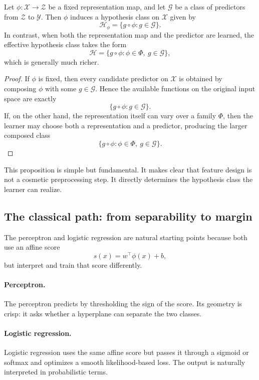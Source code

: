\begin{proposition}
Let $\phi:\mathcal X\to\mathcal Z$ be a fixed representation map, and let $\mathcal G$ be a class of predictors from $\mathcal Z$ to $\mathcal Y$. Then $\phi$ induces a hypothesis class on $\mathcal X$ given by
\[
\mathcal H_\phi=\{g\circ\phi : g\in\mathcal G\}.
\]
In contrast, when both the representation map and the predictor are learned, the effective hypothesis class takes the form
\[
\mathcal H=\{g\circ\phi : \phi\in\Phi,\ g\in\mathcal G\},
\]
which is generally much richer.
\end{proposition}

\begin{proof}
If $\phi$ is fixed, then every candidate predictor on $\mathcal X$ is obtained by composing $\phi$ with some $g\in\mathcal G$. Hence the available functions on the original input space are exactly
\[
\{g\circ\phi : g\in\mathcal G\}.
\]
If, on the other hand, the representation itself can vary over a family $\Phi$, then the learner may choose both a representation and a predictor, producing the larger composed class
\[
\{g\circ\phi : \phi\in\Phi,\ g\in\mathcal G\}.
\]
\end{proof}

This proposition is simple but fundamental. It makes clear that feature design is not a cosmetic preprocessing step. It directly determines the hypothesis class the learner can realize.

\subsection*{The classical path: from separability to margin}

The perceptron and logistic regression are natural starting points because both use an affine score
\[
s(x)=w^\top \phi(x)+b,
\]
but interpret and train that score differently.

\paragraph{Perceptron.}
The perceptron predicts by thresholding the sign of the score. Its geometry is crisp: it asks whether a hyperplane can separate the two classes.

\paragraph{Logistic regression.}
Logistic regression uses the same affine score but passes it through a sigmoid or softmax and optimizes a smooth likelihood-based loss. The output is naturally interpreted in probabilistic terms.

